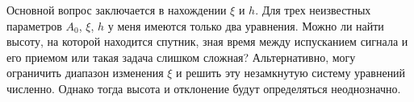 Основной вопрос заключается в нахождении $\xi$ и $h$.
Для трех неизвестных параметров $A_0$,  $\xi$,  $h$ у меня имеются только два
уравнения.  Можно ли найти высоту, на
которой находится спутник, зная время между испусканием сигнала и его приемом
или такая задача слишком сложная? 
Альтернативно, могу ограничить диапазон изменения $\xi$ и решить эту
незамкнутую систему уравнений численно. Однако тогда высота и отклонение будут
определяться неоднозначно. 




